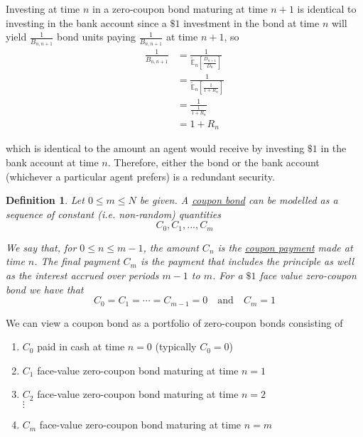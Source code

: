 \documentclass[12pt]{article}
\newtheorem{definition}{Definition}
\newlength\tindent
\renewcommand{\indent}{\hspace*{\tindent}}
\newcommand{\E}{\mathbb E}
\begin{document}
\indent Investing at time $n$ in a zero-coupon bond maturing at time $n + 1$ is identical to investing in the bank account since a $\$1$ investment in the bond at time $n$ will yield $\frac{1}{B_{n,n + 1}}$ bond units paying $\frac{1}{B_{n,n + 1}}$ at time $n + 1$, so
\begin{align*}
	\frac{1}{B_{n,n + 1}} &= \frac{1}{ \tilde{\E}_n \left[ \frac{D_{n + 1}}{D_n}  \right] } \\
	&= \frac{1}{ \tilde{\E}_n \left[ \frac{1}{1 + R_n} \right] } \\
	&= \frac{1}{ \frac{1}{ 1 + R_n } } \\
	&= 1 + R_n
\end{align*}

which is identical to the amount an agent would receive by investing $\$1$ in the bank account at time $n$. Therefore, either the bond or the bank account (whichever a particular agent prefers) is a redundant security. \\

\begin{definition} Let $0 \leq m \leq N$ be given. A \underline{coupon bond} can be modelled as a sequence of constant (i.e. non-random) quantities
\begin{equation*}
	C_0,C_1,...,C_m
\end{equation*}

We say that, for $0 \leq n \leq m - 1$, the amount $C_n$ is the \underline{coupon payment} made at time $n$. The final payment $C_m$ is the payment that includes the principle as well as the interest accrued over periods $m - 1$ to $m$. For a $\$1$ face value zero-coupon bond we have that
\begin{equation*}
 	C_0 = C_1 = \cdots = C_{m - 1} = 0 \quad \text{and} \quad C_m = 1
\end{equation*}
\end{definition}

We can view a coupon bond as a portfolio of zero-coupon bonds consisting of
\begin{enumerate}[]
	\item $C_0$ paid in cash at time $n = 0$ (typically $C_0 = 0$)
	\item $C_1$ face-value zero-coupon bond maturing at time $n = 1$
	\item $C_2$ face-value zero-coupon bond maturing at time $n = 2$ \\
	$\vdots$
	\item $C_m$ face-value zero-coupon bond maturing at time $n = m$
\end{enumerate}
\end{document}
